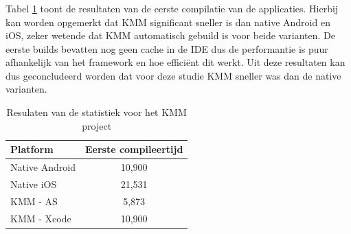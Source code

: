 \subsubsection{}
\label{sec:M-test-1-comp}
Tabel \ref{T:1e-compile} toont de resultaten van de eerste compilatie van de applicaties. Hierbij kan worden opgemerkt dat KMM significant sneller is dan native Android en iOS, zeker wetende dat KMM automatisch gebuild is voor beide varianten. De eerste builds bevatten nog geen cache in de IDE dus de performantie is puur afhankelijk van het framework en hoe efficiënt dit werkt. Uit deze resultaten kan dus geconcludeerd worden dat voor deze studie KMM sneller was dan de native varianten.

\begin{table}[H]
    \centering
    \caption{Resulaten van de statistiek voor het KMM project}
    \begin{tabular}{|l|c|}
        \hline
        {\textbf{Platform}} & {\textbf{Eerste compileertijd}} \\ \hline \hline
        Native Android&10,900\\ \hline
        Native iOS&21,531\\ \hline
        KMM - AS&5,873\\ \hline
        KMM - Xcode &10,900\\ \hline
    \end{tabular}
    \label{T:1e-compile}
\end{table}



\subsubsection{}
\label{sec:M-test-andere-comp}


